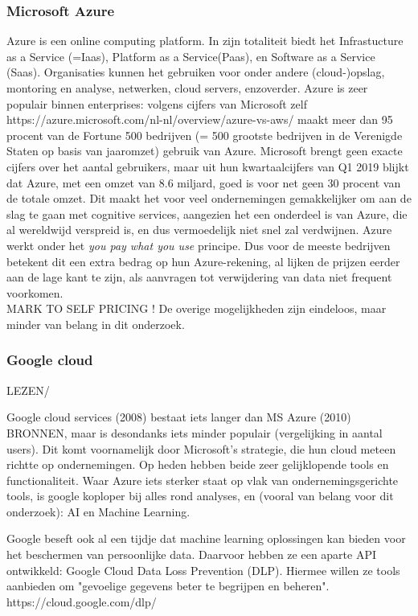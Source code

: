 \subsubsection{Microsoft Azure}
Azure is een online computing platform. In zijn totaliteit biedt het Infrastucture as a Service (=Iaas), Platform as a Service(Paas), en Software as a Service (Saas). Organisaties kunnen het gebruiken voor onder andere (cloud-)opslag, montoring en analyse, netwerken, cloud servers, enzoverder. 
Azure is zeer populair binnen enterprises: volgens cijfers van Microsoft zelf  https://azure.microsoft.com/nl-nl/overview/azure-vs-aws/ maakt meer dan 95 procent van de Fortune 500 bedrijven (= 500 grootste bedrijven in de Verenigde Staten op basis van jaaromzet) gebruik van Azure. Microsoft brengt geen exacte cijfers over het aantal gebruikers, maar uit hun kwartaalcijfers van Q1 2019 
blijkt dat Azure, met een omzet van 8.6 miljard, goed is voor net geen 30 procent van de totale omzet. 
Dit maakt het voor veel ondernemingen gemakkelijker om aan de slag te gaan met cognitive services, aangezien het een onderdeel is van Azure, die al wereldwijd verspreid is, en dus vermoedelijk niet snel zal verdwijnen. Azure werkt onder het \textit{you pay what you use} principe. Dus voor de meeste bedrijven betekent dit een extra bedrag op hun Azure-rekening, al lijken de prijzen eerder aan de lage kant te zijn, als aanvragen tot verwijdering van data niet frequent voorkomen. \\MARK TO SELF PRICING !
De overige mogelijkheden zijn eindeloos, maar minder van belang in dit onderzoek. 

\subsubsection{Google cloud}
LEZEN/ %

Google cloud services (2008) bestaat iets langer dan MS Azure (2010) BRONNEN, maar is desondanks iets minder populair (vergelijking in aantal users). Dit komt voornamelijk door Microsoft's strategie, die hun cloud meteen richtte op ondernemingen. Op heden hebben beide zeer gelijklopende tools en functionaliteit. Waar Azure iets sterker staat op vlak van ondernemingsgerichte tools, is google koploper bij alles rond analyses, en (vooral van belang voor dit onderzoek): AI en Machine Learning. 

Google beseft ook al een tijdje dat machine learning oplossingen kan bieden voor het beschermen van persoonlijke data. Daarvoor hebben ze een aparte API ontwikkeld: Google Cloud Data Loss Prevention (DLP). Hiermee willen ze tools aanbieden om "gevoelige gegevens beter te begrijpen en beheren". 
https://cloud.google.com/dlp/

